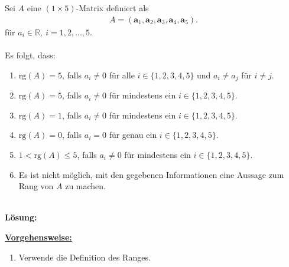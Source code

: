 \subsection*{}
Sei $ A $ eine $ (1 \times 5) $-Matrix definiert als
\begin{align*}
	A
	=
	\left(
	\textbf{a}_1,
	\textbf{a}_2,
	\textbf{a}_3,
	\textbf{a}_4,
	\textbf{a}_5
	\right).
\end{align*}
für $ a_i \in \mathbb{R}, \ i = 1,2,...,5 $.\\
\\
Es folgt, dass:
\renewcommand{\labelenumi}{(\alph{enumi})}
\begin{enumerate}
	\item 
	$ \mathrm{rg}(A) = 5 $, falls $ a_i \neq 0 $ für alle $ i \in \{1,2,3,4,5\} $ und $ a_i \neq a_j $ für $ i \neq j $.
	\item
	$ \mathrm{rg}(A) = 5 $, falls $ a_i \neq 0 $ für mindestens ein $ i \in \{1,2,3,4,5\} $.
	\item
	$ \mathrm{rg}(A) = 1 $, falls $ a_i \neq 0 $ für mindestens ein $ i \in \{1,2,3,4,5\} $.
	\item
	$ \mathrm{rg}(A) = 0 $, falls $ a_i = 0 $ für genau ein $ i \in \{1,2,3,4,5\} $.
	\item
	$1 <  \mathrm{rg}(A)\leq 5 $, falls $ a_i \neq 0 $ für mindestens ein $ i \in \{1,2,3,4,5\} $.
	\item 
	Es ist nicht möglich, mit den gegebenen Informationen eine Aussage zum Rang von $ A $ zu machen.
\end{enumerate}
\ \\
\textbf{Lösung:}
\begin{mdframed}
\underline{\textbf{Vorgehensweise:}}
\renewcommand{\labelenumi}{\theenumi.}
\begin{enumerate}
\item Verwende die Definition des Ranges.
\end{enumerate}
\end{mdframed}

